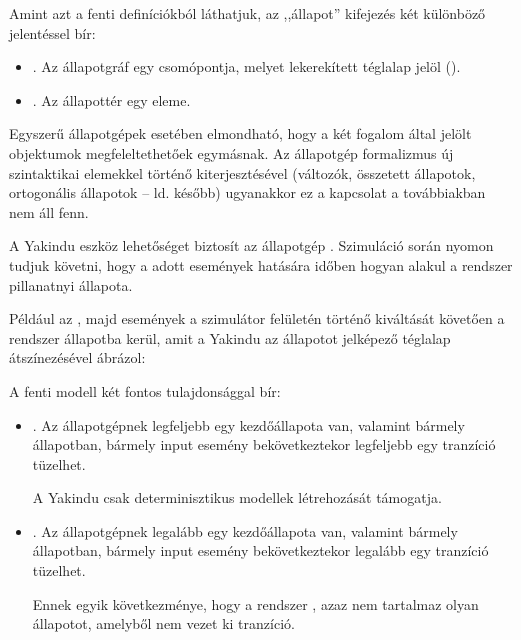 Amint azt a fenti definíciókból láthatjuk, az ,,állapot'' kifejezés két különböző jelentéssel bír:

\begin{itemize}
	\item {}. Az állapotgráf egy csomópontja, melyet lekerekített téglalap jelöl ().
	\item {}. Az állapottér egy eleme.
\end{itemize}

Egyszerű állapotgépek esetében elmondható, hogy a két fogalom által jelölt objektumok megfeleltethetőek egymásnak. Az állapotgép formalizmus új szintaktikai elemekkel történő kiterjesztésével (változók, összetett állapotok, ortogonális állapotok -- ld. később) ugyanakkor ez a kapcsolat a továbbiakban nem áll fenn.

\begin{tipp}
A Yakindu eszköz lehetőséget biztosít az állapotgép . Szimuláció során nyomon tudjuk követni, hogy a adott események hatására időben hogyan alakul a rendszer pillanatnyi állapota.

Például az , majd  események a szimulátor felületén történő kiváltását követően a rendszer  állapotba kerül, amit a Yakindu az állapotot jelképező téglalap átszínezésével ábrázol:

\end{tipp}

A fenti modell két fontos tulajdonsággal bír:

\begin{itemize}
	\item {}. Az állapotgépnek legfeljebb egy kezdőállapota van, valamint bármely állapotban, bármely input esemény bekövetkeztekor legfeljebb egy tranzíció tüzelhet.

	\begin{megjegyzes}
		A Yakindu csak determinisztikus modellek létrehozását támogatja.
	\end{megjegyzes}

	\item {}. Az állapotgépnek legalább egy kezdőállapota van, valamint bármely állapotban, bármely input esemény bekövetkeztekor legalább egy tranzíció tüzelhet.

	\begin{megjegyzes}
		Ennek egyik következménye, hogy a rendszer , azaz nem tartalmaz olyan állapotot, amelyből nem vezet ki tranzíció.
	\end{megjegyzes}

\end{itemize}


